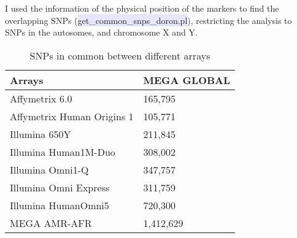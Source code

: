 \documentclass[11pt]{report}
\begin{document}
I used the information of the physical position of the markers to find the overlapping SNPs (\colorbox{Lavender}{get\_common\_snps\_doron.pl}), restricting the analysis to SNPs in the autosomes, and chromosome X and Y. 
\\

\begin{table}[ht]
\centering
\caption{SNPs in common between different arrays}
\label{my-label}
\begin{tabular}{|l||l|}
\hline
Arrays & MEGA GLOBAL \\ \hline \hline
Affymetrix 6.0 & 165,795 \\ \hline
Affymetrix Human Origins 1 & 105,771 \\ \hline
Illumina 650Y & 211,845 \\ \hline
Illumina Human1M-Duo & 308,002 \\ \hline
Illumina Omni1-Q & 347,757\\ \hline
Illumina Omni Express & 311,759 \\ \hline
Illumina HumanOmni5 & 720,300\\ \hline
MEGA AMR-AFR & 1,412,629 \\ \hline
\end{tabular}
\end{table}
\end{document}
